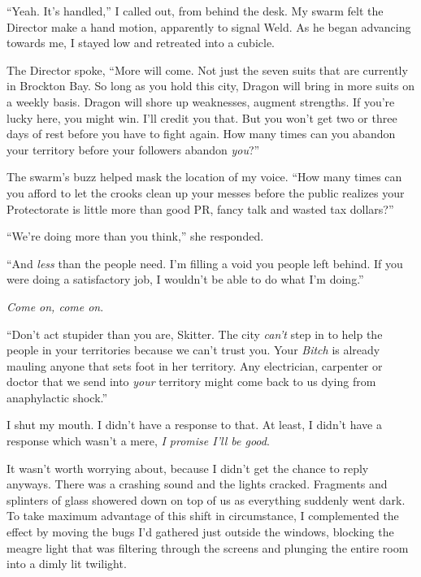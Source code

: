 ``Yeah.  It's handled,'' I called out, from behind the desk.  My swarm felt the Director make a hand motion, apparently to signal Weld.  As he began advancing towards me, I stayed low and retreated into a cubicle.



The Director spoke, ``More will come.  Not just the seven suits that are currently in Brockton Bay.  So long as you hold this city, Dragon will bring in more suits on a weekly basis.  Dragon will shore up weaknesses, augment strengths.  If you're lucky here, you might win.  I'll credit you that.  But you won't get two or three days of rest before you have to fight again.  How many times can you abandon your territory before your followers abandon \emph{you}?''



The swarm's buzz helped mask the location of my voice.  ``How many times can you afford to let the crooks clean up your messes before the public realizes your Protectorate is little more than good PR, fancy talk and wasted tax dollars?''



``We're doing more than you think,'' she responded.



``And \emph{less} than the people need.  I'm filling a void you people left behind.  If you were doing a satisfactory job, I wouldn't be able to do what I'm doing.''



\emph{Come on, come on}.



``Don't act stupider than you are, Skitter.  The city\emph{ can't} step in to help the people in your territories because we can't trust you.  Your \emph{Bitch} is already mauling anyone that sets foot in her territory.  Any electrician, carpenter or doctor that we send into \emph{your} territory might come back to us dying from anaphylactic shock.''



I shut my mouth.  I didn't have a response to that.  At least, I didn't have a response which wasn't a mere, \emph{I promise I'll be good}.



It wasn't worth worrying about, because I didn't get the chance to reply anyways.  There was a crashing sound and the lights cracked.  Fragments and splinters of glass showered down on top of us as everything suddenly went dark.  To take maximum advantage of this shift in circumstance, I complemented the effect by moving the bugs I'd gathered just outside the windows, blocking the meagre light that was filtering through the screens and plunging the entire room into a dimly lit twilight.



